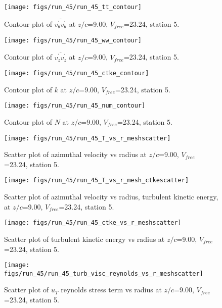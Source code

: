 \begin{figure}[H]
\centering
\texttt{[image: figs/run\_45/run\_45\_tt\_contour]}
\caption{Contour plot of $\overline{v_{\theta}^{\prime} v_{\theta}^{\prime}}$ at $z/c$=9.00, $V_{free}$=23.24, station 5.}
\end{figure}


\begin{figure}[H]
\centering
\texttt{[image: figs/run\_45/run\_45\_ww\_contour]}
\caption{Contour plot of $\overline{v_{z}^{\prime} v_{z}^{\prime}}$ at $z/c$=9.00, $V_{free}$=23.24, station 5.}
\end{figure}


\begin{figure}[H]
\centering
\texttt{[image: figs/run\_45/run\_45\_ctke\_contour]}
\caption{Contour plot of $k$ at $z/c$=9.00, $V_{free}$=23.24, station 5.}
\end{figure}


\begin{figure}[H]
\centering
\texttt{[image: figs/run\_45/run\_45\_num\_contour]}
\caption{Contour plot of $N$ at $z/c$=9.00, $V_{free}$=23.24, station 5.}
\end{figure}


\begin{figure}[H]
\centering
\texttt{[image: figs/run\_45/run\_45\_T\_vs\_r\_meshscatter]}
\caption{Scatter plot of azimuthal velocity vs radius at $z/c$=9.00, $V_{free}$=23.24, station 5.}
\end{figure}


\begin{figure}[H]
\centering
\texttt{[image: figs/run\_45/run\_45\_T\_vs\_r\_mesh\_ctkescatter]}
\caption{Scatter plot of azimuthal velocity vs radius, turbulent kinetic energy, at $z/c$=9.00, $V_{free}$=23.24, station 5.}
\end{figure}


\begin{figure}[H]
\centering
\texttt{[image: figs/run\_45/run\_45\_ctke\_vs\_r\_meshscatter]}
\caption{Scatter plot of turbulent kinetic energy vs radius at $z/c$=9.00, $V_{free}$=23.24, station 5.}
\end{figure}


\begin{figure}[H]
\centering
\texttt{[image: figs/run\_45/run\_45\_turb\_visc\_reynolds\_vs\_r\_meshscatter]}
\caption{Scatter plot of $
u_T$ reynolds stress term vs radius at $z/c$=9.00, $V_{free}$=23.24, station 5.}
\end{figure}


